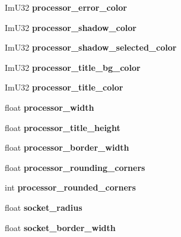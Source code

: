 \begin{DoxyCompactItemize}
\mbox{\label{struct_style_a8dc2b74c10a1853448e6d63c797f9dd9}} 
Im\+U32 {\bfseries processor\+\_\+error\+\_\+color}
\item 
\mbox{\label{struct_style_a9a2342379184911a296ddb5b5fa61f23}} 
Im\+U32 {\bfseries processor\+\_\+shadow\+\_\+color}
\item 
\mbox{\label{struct_style_aef2dfe47307aa232fd6bbea1a2895815}} 
Im\+U32 {\bfseries processor\+\_\+shadow\+\_\+selected\+\_\+color}
\item 
\mbox{\label{struct_style_a2c3b2136d3815429becd92f4b7d381a2}} 
Im\+U32 {\bfseries processor\+\_\+title\+\_\+bg\+\_\+color}
\item 
\mbox{\label{struct_style_accef58fa3f882ba714f782a820bfc610}} 
Im\+U32 {\bfseries processor\+\_\+title\+\_\+color}
\item 
\mbox{\label{struct_style_ae2f2afecfb8e8c418e8674ed3a55bfc1}} 
float {\bfseries processor\+\_\+width}
\item 
\mbox{\label{struct_style_a140f48d10f702f67364fa7e3b4eb5016}} 
float {\bfseries processor\+\_\+title\+\_\+height}
\item 
\mbox{\label{struct_style_ae092dceddfe4bfbb988bd6cd6acbcd6f}} 
float {\bfseries processor\+\_\+border\+\_\+width}
\item 
\mbox{\label{struct_style_a529777cc46850163bc1c6d9ad0f3ad07}} 
float {\bfseries processor\+\_\+rounding\+\_\+corners}
\item 
\mbox{\label{struct_style_aee30b7b309e9a10d60227029c17fb4aa}} 
int {\bfseries processor\+\_\+rounded\+\_\+corners}
\item 
\mbox{\label{struct_style_ac7fa826d247bd87b8b5a5aaa3c57a400}} 
float {\bfseries socket\+\_\+radius}
\item 
\mbox{\label{struct_style_a079f225000df13c582d14545c1cf6ae7}} 
float {\bfseries socket\+\_\+border\+\_\+width}

\end{DoxyCompactItemize}
